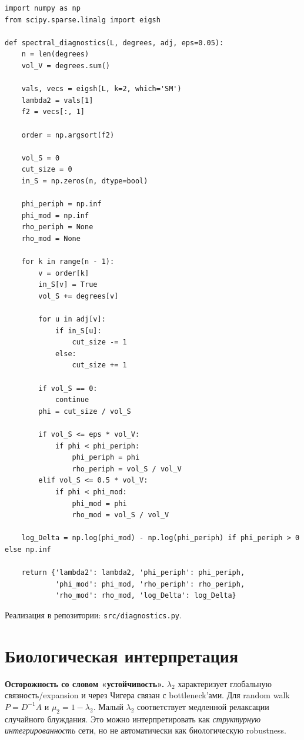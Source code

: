 \documentclass[11pt,a4paper]{article}
\theoremstyle{plain}
\theoremstyle{definition}
\theoremstyle{remark}
\newcommand{\lamtwo}{\lambda_2}
\begin{document}
\begin{lstlisting}
import numpy as np
from scipy.sparse.linalg import eigsh

def spectral_diagnostics(L, degrees, adj, eps=0.05):
    n = len(degrees)
    vol_V = degrees.sum()

    vals, vecs = eigsh(L, k=2, which='SM')
    lambda2 = vals[1]
    f2 = vecs[:, 1]

    order = np.argsort(f2)

    vol_S = 0
    cut_size = 0
    in_S = np.zeros(n, dtype=bool)

    phi_periph = np.inf
    phi_mod = np.inf
    rho_periph = None
    rho_mod = None

    for k in range(n - 1):
        v = order[k]
        in_S[v] = True
        vol_S += degrees[v]

        for u in adj[v]:
            if in_S[u]:
                cut_size -= 1
            else:
                cut_size += 1

        if vol_S == 0:
            continue
        phi = cut_size / vol_S

        if vol_S <= eps * vol_V:
            if phi < phi_periph:
                phi_periph = phi
                rho_periph = vol_S / vol_V
        elif vol_S <= 0.5 * vol_V:
            if phi < phi_mod:
                phi_mod = phi
                rho_mod = vol_S / vol_V

    log_Delta = np.log(phi_mod) - np.log(phi_periph) if phi_periph > 0 else np.inf

    return {'lambda2': lambda2, 'phi_periph': phi_periph,
            'phi_mod': phi_mod, 'rho_periph': rho_periph,
            'rho_mod': rho_mod, 'log_Delta': log_Delta}
\end{lstlisting}

Реализация в репозитории: \texttt{src/diagnostics.py}.

\section{Биологическая интерпретация}
\label{sec:bio}

\textbf{Осторожность со словом «устойчивость».} $\lamtwo$ характеризует
глобальную связность/expansion и через Чигера связан с bottleneck'ами. Для
random walk $P=D^{-1}A$ и $\mu_2=1-\lamtwo$. Малый $\lamtwo$ соответствует
медленной релаксации случайного блуждания. Это можно интерпретировать как
\emph{структурную интегрированность} сети, но не автоматически как
биологическую robustness.
\end{document}
